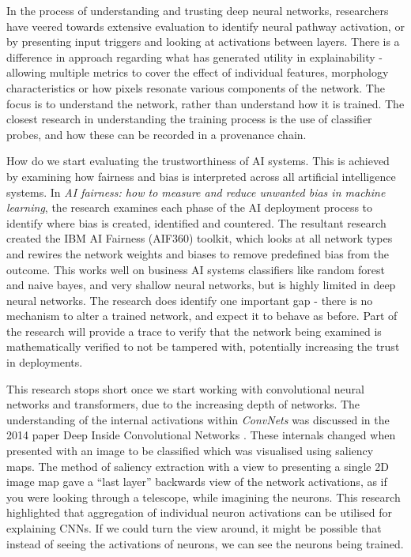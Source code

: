 In the process of understanding and trusting deep neural networks, researchers have veered towards extensive evaluation to identify neural pathway activation, or by presenting input triggers and looking at activations between layers\cite{liVisualizingLossLandscape2018}. There is a difference in approach regarding what has generated utility in explainability - allowing multiple metrics to cover the effect of individual features, morphology characteristics or how pixels resonate various components of the network. The focus is to understand the network, rather than understand how it is trained. The closest research in understanding the training process is the use of classifier probes, and how these can be recorded in a provenance chain.

How do we start evaluating the trustworthiness of AI systems. This is achieved by examining how fairness and bias is interpreted across all artificial intelligence systems. In \textit{AI fairness: how to measure and reduce unwanted bias in machine learning}\cite{mahoneyAIFairnessHow2020}, the research examines each phase of the AI deployment process to identify where bias is created, identified and countered. The resultant research created the IBM AI Fairness (AIF360) toolkit, which looks at all network types and rewires the network weights and biases to remove predefined bias from the outcome. This works well on business AI systems classifiers like random forest and naive bayes, and very shallow neural networks, but is highly limited in deep neural networks. The research does identify one important gap - there is no mechanism to alter a trained network, and expect it to behave as before. Part of the research will provide a trace to verify that the network being examined is mathematically verified to not be tampered with, potentially increasing the trust in deployments.

This research stops short once we start working with convolutional neural networks and transformers, due to the increasing depth of networks. The understanding of the internal activations within \textit{ConvNets} was discussed in the 2014 paper Deep Inside Convolutional Networks \cite{simonyanDeepConvolutionalNetworks2014}. These internals changed when presented with an image to be classified which was visualised using saliency maps. The method of saliency extraction with a view to presenting a single 2D image map gave a “last layer” backwards view of the network activations, as if you were looking through a telescope, while imagining the neurons. This research highlighted that aggregation of individual neuron activations can be utilised for explaining CNNs. If we could turn the view around, it might be possible that instead of seeing the activations of neurons, we can see the neurons being trained.

